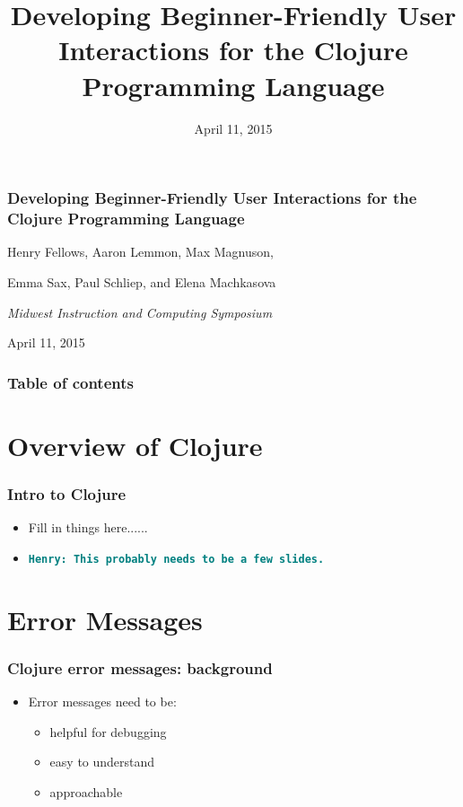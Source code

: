 \documentclass{beamer}
\newcommand{\comment}[1]{{\bf \tt  {#1}}}
\newcommand{\hfcomment}[1]{\textcolor{Teal}{\comment{Henry: {#1}}}}
\begin{document}
\title{Developing Beginner-Friendly User Interactions for the Clojure Programming Language}
\date{April 11, 2015}

\begin{frame}
\frametitle{Developing Beginner-Friendly User Interactions for the Clojure Programming Language}
{\centering
\noindent
Henry Fellows, Aaron Lemmon, Max Magnuson, \par
Emma Sax, Paul Schliep, and Elena Machkasova \par

{\it 
Midwest Instruction and Computing Symposium\par
April 11, 2015\par}
}
\end{frame}

\begin{frame}
\frametitle{Table of contents}
\tableofcontents  
\end{frame}

\section{Overview of Clojure}

\begin{frame}
\frametitle{Intro to Clojure}
	\begin{itemize}
  	 \item Fill in things here......
  	 \item \hfcomment{This probably needs to be a few slides.}
	 \end{itemize}
\end{frame}

\section{Error Messages}

\begin{frame}
\frametitle{Clojure error messages: background}
	\begin{itemize}
  		\item Error messages need to be:
  		\begin{itemize}
  	 		\item helpful for debugging
  	 		\item easy to understand
  	 		\item approachable
  		\end{itemize}
	 \end{itemize}
\end{frame}
\end{document}
